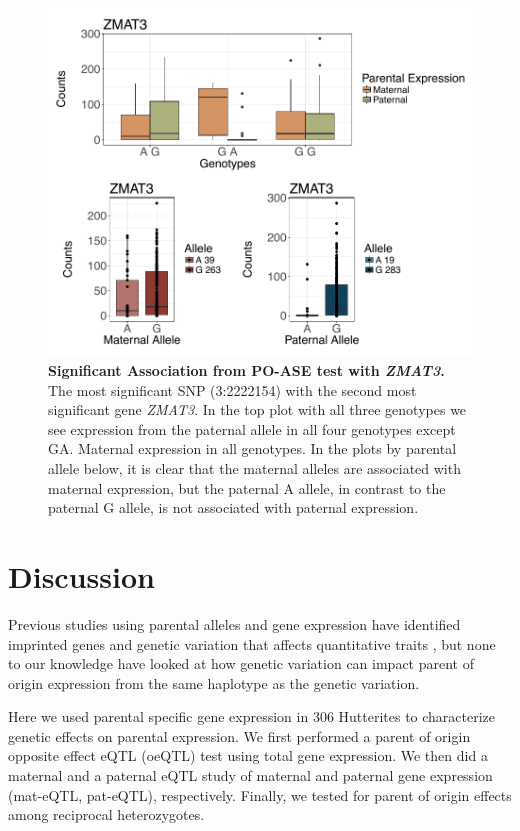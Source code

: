 \begin{figure}[!htb]
\centering \includegraphics[width=5in]{img/ch04/ZMAT3.pdf}
\caption[Significant Association from PO-ASE test with \emph{ZMAT3}.]{\textbf{Significant Association from PO-ASE test with \emph{ZMAT3}.} The most significant SNP (3:2222154) with the second most significant gene \emph{ZMAT3}. In the top plot with all three genotypes we see expression from the paternal allele in all four genotypes except GA. Maternal expression in all genotypes. In the plots by parental allele below, it is clear that the maternal alleles are associated with maternal expression, but the paternal A allele, in contrast to the paternal G allele, is not associated with paternal expression.}
\label{fig:ZMAT3}
\end{figure}
\clearpage


\section{Discussion}\label{ch04-discussion}

Previous studies using parental alleles and gene expression have identified imprinted genes and genetic variation that affects quantitative traits \cite{Zoledziewska:2015do,Baran:2015cx,Benonisdottir:2016dz,Garg2012a}, but none to our knowledge have looked at how genetic variation can impact parent of origin expression from the same haplotype as the genetic variation.

Here we used parental specific gene expression in 306 Hutterites to characterize genetic effects on parental expression. We first performed a parent of origin opposite effect eQTL (oeQTL) test using total gene expression. We then did a maternal and a paternal eQTL study of maternal and paternal gene expression (mat-eQTL, pat-eQTL), respectively. Finally, we tested for parent of origin effects among reciprocal heterozygotes.

